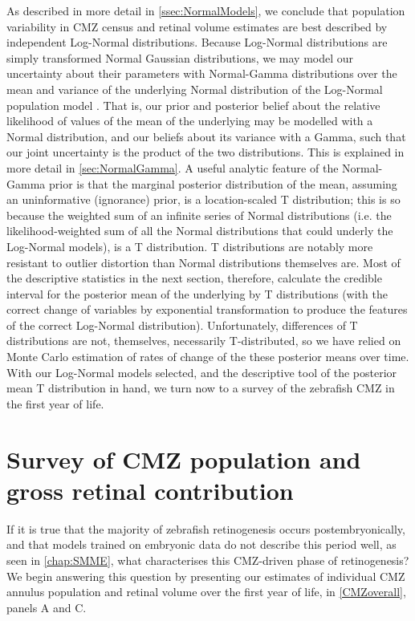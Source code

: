 As described in more detail in \autoref{ssec:NormalModels}, we conclude that population variability in CMZ census and retinal volume estimates are best described by independent Log-Normal distributions. Because Log-Normal distributions are simply transformed Normal Gaussian distributions, we may model our uncertainty about their parameters with Normal-Gamma distributions over the mean and variance of the underlying Normal distribution of the Log-Normal population model \cite{}. That is, our prior and posterior belief about the relative likelihood of values of the mean of the underlying may be modelled with a Normal distribution, and our beliefs about its variance with a Gamma, such that our joint uncertainty is the product of the two distributions. This is explained in more detail in \autoref{sec:NormalGamma}. A useful analytic feature of the Normal-Gamma prior is that the marginal posterior distribution of the mean, assuming an uninformative (ignorance) prior, is a location-scaled T distribution; this is so because the weighted sum of an infinite series of Normal distributions (i.e. the likelihood-weighted sum of all the Normal distributions that could underly the Log-Normal models), is a T distribution. T distributions are notably more resistant to outlier distortion than Normal distributions themselves are. Most of the descriptive statistics in the next section, therefore, calculate the credible interval for the posterior mean of the underlying by T distributions (with the correct change of variables by exponential transformation to produce the features of the correct Log-Normal distribution). Unfortunately, differences of T distributions are not, themselves, necessarily T-distributed, so we have relied on Monte Carlo estimation of rates of change of the these posterior means over time. With our Log-Normal models selected, and the descriptive tool of the posterior mean T distribution in hand, we turn now to a survey of the zebrafish CMZ in the first year of life.

\section{Survey of CMZ population and gross retinal contribution}

If it is true that the majority of zebrafish retinogenesis occurs postembryonically, and that models trained on embryonic data do not describe this period well, as seen in \autoref{chap:SMME}, what characterises this CMZ-driven phase of retinogenesis? We begin answering this question by presenting our estimates of individual CMZ annulus population and retinal volume over the first year of life, in \autoref{CMZoverall}, panels A and C.

